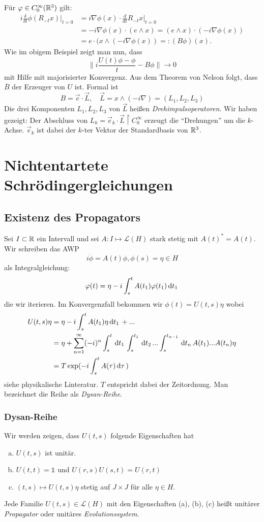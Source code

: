 \documentclass{mycourse}
\begin{document}
Für $\phi\in C_0^\infty(\R^3)$ gilt:
\begin{align*}
i \frac{\delta}{\delta t} \phi(R_{-t}x)|_{t=0} &= i \nabla \phi(x) \cdot \frac{d}{dt} R_{-t} x|_{t=0}\\
&=-i \nabla \phi(x) \cdot (e \land x) = (e\land x) \cdot (-i \nabla \phi(x))\\&= e\cdot (x \land(-i \nabla \phi(x)) =: (B\phi)(x).
\end{align*}
Wie im obigem Beispiel zeigt man  nun, dass 
\[
\|i \frac{U(t)\phi- \phi}{t} - B\phi\| \to 0
\]
mit Hilfe mit majorisierter Konvergenz. Aus dem Theorem von Nelson folgt, dass $\overline{B}$ der Erzeuger von $U$ ist. Formal ist
\[
B=\vec e \cdot \vec L, \quad \vec L=x \land (-i \nabla) =(L_1, L_2, L_3)
\]
Die drei Komponenten $L_1, L_2, L_3$ von $\vec L$ heißen \emph{Drehimpulsoperatoren}. Wir haben gezeigt: Der Abschluss von $L_k=\vec e_k \cdot \vec L \upharpoonright C_0^\infty$ erzeugt die "`Drehungen"' um die $k$-Achse. $\vec e_k$ ist dabei der $k$-ter Vektor der Standardbasis von $\R^3$.

\chapter{Nichtentartete Schrödingergleichungen}\label{4}

\section{Existenz des Propagators}
Sei $I\subset \R$ ein Intervall und sei $A: I \mapsto \mathcal L(H)$ stark stetig mit $A(t)^*=A(t)$. Wir schreiben das AWP
\[
i \dot \phi = A(t) \phi, \phi(s)=\eta \in H
\]
als Integralgleichung:
\[
\phi(t)=\eta-i \int_s^t A(t_1) \phi(t_1) \dx[t_1]
\]
die wir iterieren. Im Konvergenzfall bekommen wir $\phi(t)=U(t,s) \eta$ wobei
\begin{align*}
U(t,s) \eta&= \eta- i \int_s^t A(t_1) \eta \dx[t_1]+ ... \\
&= \eta + \sum_{n=1}^\infty (-i)^n \int_s^t \dx[t_1] \int_s^{t_1} \dx[t_2] ... \int_s^{t_{n-1}} \dx[t_n] A(t_1)... A(t_n) \eta\\
&=T \exp(-i \int_s^t A(\tau) \dx[\tau])
\end{align*}
siehe physikalische Linteratur. $T$ entspricht dabei der Zeitordnung. Man bezeichnet die Reihe als \emph{Dysan-Reihe}.
\subsection{Dysan-Reihe}
Wir werden zeigen, dass $U(t,s)$ folgende Eigenschaften hat
\begin{enumerate}[a)]
\item $U(t,s)$ ist unitär.
\item $U(t, t)=\mathbb 1$ und $U(r,s)U(s,t)= U(r,t)$
\item $(t,s)\mapsto U(t,s) \eta$ stetig auf $J\times J$ für alle $\eta \in H$.
\end{enumerate}
Jede Familie $U(t,s)\in \mathcal L(H)$ mit den Eigenschaften (a), (b), (c) heißt unitärer \emph{Propagator} oder unitäres  \emph{Evolutionssystem}.
\end{document}
